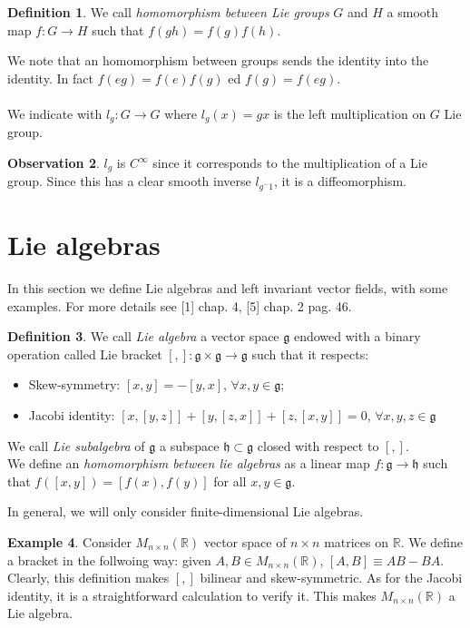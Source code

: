 \documentclass[12pt,a4paper]{report}
\theoremstyle{definition}
\newtheorem{Def}{Definition}[chapter]
\theoremstyle{Theorem}
\theoremstyle{definition}
\newtheorem{Ex}[Def]{Example}
\theoremstyle{definition}
\newtheorem{Obs}[Def]{Observation}
\begin{document}
	\begin{Def}
		We call \textit{homomorphism between Lie groups} $G$ and $H$ a smooth map $f:G\rightarrow H$ such that $f(gh)=f(g)f(h)$.
	\end{Def}
	We note that an homomorphism between groups sends the identity into the identity. In fact $f(eg)=f(e)f(g)$ ed $f(g)=f(eg)$.\\\\
	We indicate with $l_g:G\rightarrow G$ where $l_g(x)=gx$ is the left multiplication on $G$ Lie group.
	\begin{Obs}
		$l_g$ is $C^\infty$ since it corresponds to the multiplication of a Lie group. Since this has a clear smooth inverse $l_{g^-1}$, it is a diffeomorphism.
	\end{Obs}
	\section{Lie algebras}
	In this section we define Lie algebras and left invariant vector fields, with some examples. For more details see [1] chap. 4, [5] chap. 2 pag. 46.
	\begin{Def}
		We call \textit{Lie algebra} a vector space $\mathfrak{g}$ endowed with a binary operation called Lie bracket $[,]:\mathfrak{g}\times\mathfrak{g}\rightarrow\mathfrak{g}$ such that it respects:
		\begin{itemize}
			\item Skew-symmetry: $[x,y]=-[y,x]$, $\forall x,y\in\mathfrak{g}$;
			\item Jacobi identity: $[x,[y,z]]+[y,[z,x]]+[z,[x,y]]=0$, $\forall x,y,z\in \mathfrak{g}$ 
		\end{itemize}
		We call \textit{Lie subalgebra} of $\mathfrak{g}$ a subspace $\mathfrak{h}\subset\mathfrak{g}$ closed with respect to $[,]$.\\
		We define an \textit{homomorphism between lie algebras} as a linear map $f:\mathfrak{g}\rightarrow\mathfrak{h}$ such that $f([x,y])=[f(x),f(y)]$ for all $x,y\in\mathfrak{g}$.
	\end{Def}
	In general, we will only consider finite-dimensional Lie algebras.
	\begin{Ex} \label{Obs: bracket Mnn}
		Consider $M_{n\times n}(\mathbb{R})$ vector space of $n\times n$ matrices on $\mathbb{R}$. We define a bracket in the follwoing way: given $A,B\in M_{n\times n}(\mathbb{R})$, $[A,B]\equiv AB-BA$. Clearly, this definition makes $[,]$ bilinear and skew-symmetric. As for the Jacobi identity, it is a straightforward calculation to verify it. This makes $M_{n\times n}(\mathbb{R})$ a Lie algebra. 
	\end{Ex}
\end{document}
